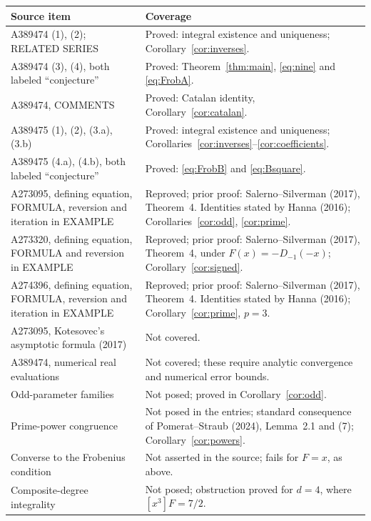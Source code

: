 \documentclass[11pt]{article}
\begin{document}
\small
\begin{longtable}{@{}p{.30\linewidth}p{.65\linewidth}@{}}
\toprule
Source item & Coverage\\
\midrule
\endhead
A389474 (1), (2); RELATED SERIES & Proved: integral existence and uniqueness;
Corollary~\ref{cor:inverses}.\\
A389474 (3), (4), both labeled ``conjecture'' & Proved: Theorem~\ref{thm:main},
\eqref{eq:nine} and \eqref{eq:FrobA}.\\
A389474, COMMENTS & Proved: Catalan identity, Corollary~\ref{cor:catalan}.\\
A389475 (1), (2), (3.a), (3.b) & Proved: integral existence and uniqueness;
Corollaries~\ref{cor:inverses}--\ref{cor:coefficients}.\\
A389475 (4.a), (4.b), both labeled ``conjecture'' & Proved:
\eqref{eq:FrobB} and \eqref{eq:Bsquare}.\\
A273095, defining equation, FORMULA, reversion and iteration in EXAMPLE &
Reproved; prior proof: Salerno--Silverman (2017), Theorem~4.
Identities stated by Hanna (2016); Corollaries~\ref{cor:odd}, \ref{cor:prime}.\\
A273320, defining equation, FORMULA and reversion in EXAMPLE &
Reproved; prior proof: Salerno--Silverman (2017), Theorem~4,
under $F(x)=-D_{-1}(-x)$; Corollary~\ref{cor:signed}.\\
A274396, defining equation, FORMULA, reversion and iteration in EXAMPLE &
Reproved; prior proof: Salerno--Silverman (2017), Theorem~4.
Identities stated by Hanna (2016); Corollary~\ref{cor:prime}, $p=3$.\\
A273095, Kotesovec's asymptotic formula (2017) & Not covered.\\
A389474, numerical real evaluations & Not covered; these require analytic
convergence and numerical error bounds.\\
Odd-parameter families & Not posed; proved in Corollary~\ref{cor:odd}.\\
Prime-power congruence & Not posed in the entries; standard consequence of
Pomerat--Straub (2024), Lemma~2.1 and (7); Corollary~\ref{cor:powers}.\\
Converse to the Frobenius condition & Not asserted in the source;
fails for $F=x$, as above.\\
Composite-degree integrality & Not posed; obstruction proved for $d=4$,
where $[x^3]F=7/2$.\\
\bottomrule
\end{longtable}
\normalsize
\end{document}
